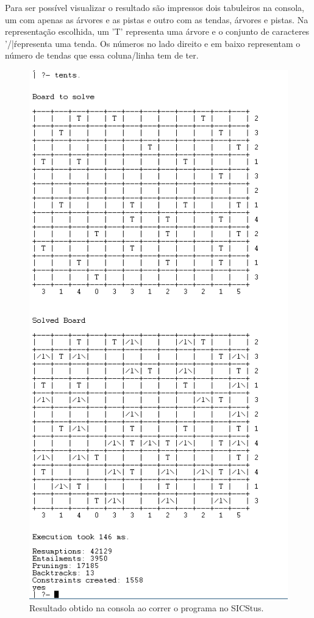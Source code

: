 \documentclass[runningheads,a4paper]{llncs}
\begin{document}
Para ser possível visualizar o resultado são impressos dois tabuleiros na consola, um com apenas as árvores e as pistas e outro com as tendas, árvores e pistas. Na representação escolhida, um 'T' representa uma árvore e o conjunto de caracteres '/|\' representa uma tenda. 
Os números no lado direito e em baixo representam o número de tendas que essa coluna/linha tem de ter.

\begin{figure}
  \includegraphics[scale=0.8]{images/result.png}
  \caption{Resultado obtido na consola ao correr o programa no SICStus.}
  \label{fig:Resultados}
\end{figure}
\end{document}
